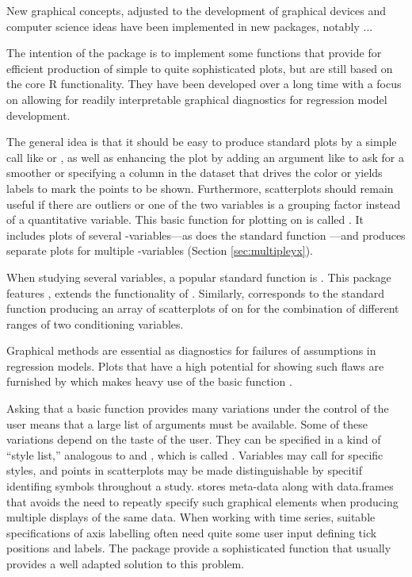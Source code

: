 \documentclass[11pt]{article}\usepackage[]{graphicx}\usepackage[]{color}
\begin{document}
New graphical concepts, adjusted to the development of graphical devices
and computer science ideas have been implemented in new packages, 
notably  ...

The intention of the package  is to implement some functions
that provide for efficient production of simple to quite sophisticated plots,
but are still based on the core R functionality.
They have been developed over a long time with a focus on allowing 
for readily interpretable graphical diagnostics for regression model
development. 

The general idea is that it should be easy to produce standard plots 
by a simple call like  or , 
as well as enhancing the plot by adding an argument like  
to ask for a smoother or specifying 
a column in the dataset that drives the color or yields labels to mark the
points to be shown. 
Furthermore, scatterplots should remain useful if there are outliers 
or one of the two
variables is a grouping factor instead of a quantitative variable.
This basic function for plotting  on  is called .
It includes plots of several -variables---as does the standard
function ---and produces separate plots for multiple
-variables (Section \ref{sec:multipleyx}).

When studying several variables, a popular standard function is .
This package features , extends the functionality of .
Similarly,  corresponds to the standard function 
producing an array of scatterplots of  on  for the combination of
different ranges of two conditioning variables.

Graphical methods are essential as diagnostics for failures of assumptions
in regression models. Plots that have a high potential for showing such
flaws are furnished by  which makes heavy use of the basic
function .

Asking that a basic function provides many variations under the control of
the user means that a large list of arguments must be available.
Some of these variations depend on the taste of the user. 
They can be specified in a kind of ``style list,'' analogous to 
 and , which is called .
Variables may call for specific styles, and points in scatterplots 
may be made distinguishable by specitif identifing symbols throughout 
a study. \T[Plgraphics] stores meta-data along with data.frames 
that avoids the need to repeatly specify such graphical elements 
when producing multiple displays of the same data.
When working with time series, suitable specifications of axis labelling
often need quite some user input defining tick positions and labels.
The package provide a sophisticated function that usually provides 
a well adapted solution to this problem.
\end{document}

